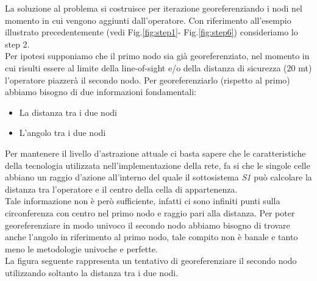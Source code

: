 La soluzione al problema si costruisce per iterazione georeferenziando i nodi nel momento in cui vengono aggiunti dall'operatore. Con riferimento all'esempio illustrato precedentemente (vedi Fig.\ref{fig:step1}- Fig.\ref{fig:step6}) consideriamo lo step 2.\\
Per ipotesi supponiamo che il primo nodo sia già georeferenziato, nel momento in cui risulti essere al limite della line-of-sight e/o della distanza di sicurezza (20 mt) l'operatore piazzerà il secondo nodo. Per georeferenziarlo (rispetto al primo) abbiamo bisogno di due informazioni fondamentali:
\begin{itemize}
	\item La distanza tra i due nodi
	\item L'angolo tra i due nodi
\end{itemize} 
Per mantenere il livello d'astrazione attuale ci basta sapere che le caratteristiche della tecnologia utilizzata nell'implementazione della rete, fa si che le singole celle abbiano un raggio d'azione all'interno del quale il sottosistema \textit{S1} può calcolare la distanza tra l'operatore e il centro della cella di appartenenza.\\
Tale informazione non è però sufficiente, infatti ci sono infiniti punti sulla circonferenza con centro nel primo nodo e raggio pari alla distanza. Per poter georeferenziare in modo univoco il secondo nodo abbiamo bisogno di trovare anche l'angolo in riferimento al primo nodo, tale compito non è banale e tanto meno le metodologie univoche e perfette.\\
La figura seguente rappresenta un tentativo di georeferenziare il secondo nodo utilizzando soltanto la distanza tra i due nodi.
